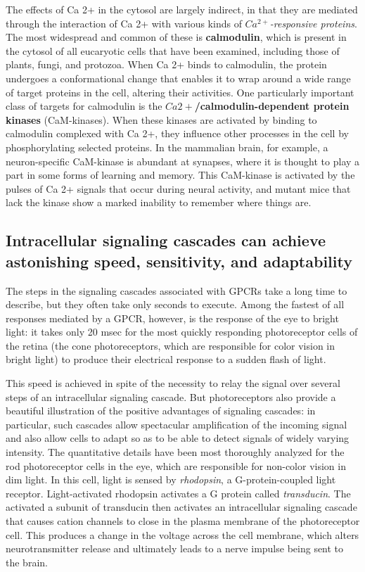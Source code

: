 The effects of Ca 2+ in the cytosol are largely indirect, in that they are mediated 
through the interaction of Ca 2+ with various kinds of \textit{$Ca^{2+}$-responsive
proteins}. The most widespread and common of these is \textbf{calmodulin},
which is present in the cytosol of all eucaryotic cells that have been examined, 
including those of plants, fungi, and protozoa. When Ca 2+ binds to
calmodulin, the protein undergoes a conformational change that enables
it to wrap around a wide range of target proteins in the cell, altering their
activities. One particularly important class of targets for
calmodulin is the \textbf{$Ca 2+$/calmodulin-dependent protein kinases} (CaM-kinases). 
When these kinases are activated by binding to calmodulin
complexed with Ca 2+, they influence other processes in the cell by phosphorylating 
selected proteins. In the mammalian brain, for example, a
neuron-specific CaM-kinase is abundant at synapses, where it is thought
to play a part in some forms of learning and memory. This CaM-kinase is
activated by the pulses of Ca 2+ signals that occur during neural activity,
and mutant mice that lack the kinase show a marked inability to remember 
where things are.

\subsection{Intracellular signaling cascades can achieve astonishing speed, sensitivity, and adaptability}

The steps in the signaling cascades associated with GPCRs take a long
time to describe, but they often take only seconds to execute.
Among the fastest of all responses
mediated by a GPCR, however, is the response of the eye to bright light:
it takes only 20 msec for the most quickly responding photoreceptor cells
of the retina (the cone photoreceptors, which are responsible for color
vision in bright light) to produce their electrical response to a sudden
flash of light.

This speed is achieved in spite of the necessity to relay the signal over
several steps of an intracellular signaling cascade. But photoreceptors
also provide a beautiful illustration of the positive advantages of signaling 
cascades: in particular, such cascades allow spectacular amplification
of the incoming signal and also allow cells to adapt so as to be able to
detect signals of widely varying intensity. The quantitative details have
been most thoroughly analyzed for the rod photoreceptor cells in the eye,
which are responsible for non-color vision in dim light. In
this cell, light is sensed by \textit{rhodopsin}, a G-protein-coupled light receptor. 
Light-activated rhodopsin activates a G protein called \textit{transducin}. The
activated a subunit of transducin then activates an intracellular signaling
cascade that causes cation channels to close in the plasma membrane
of the photoreceptor cell. This produces a change in the voltage across
the cell membrane, which alters neurotransmitter release and ultimately
leads to a nerve impulse being sent to the brain.

